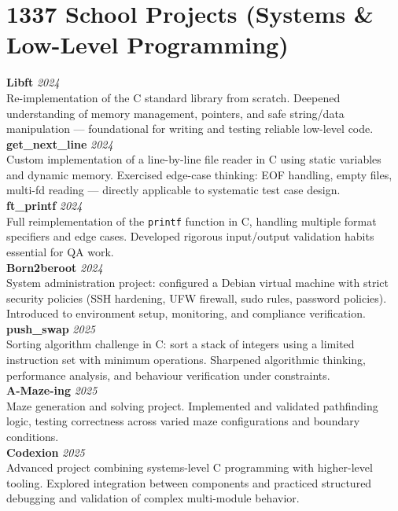 \documentclass[10pt, a4paper]{article}
\newcommand{\project}[3]{%
  \textbf{\color{black}#1} \hfill \textit{\small\color{medgray}#2}\\
  {\small\color{darkgray}#3}\\
}
\begin{document}
\section{1337 School Projects (Systems \& Low-Level Programming)}

\project{Libft}{2024}%
  {Re-implementation of the C standard library from scratch. Deepened understanding of memory management, pointers, and safe string/data manipulation — foundational for writing and testing reliable low-level code.}

\vspace{4pt}
\project{get\_next\_line}{2024}%
  {Custom implementation of a line-by-line file reader in C using static variables and dynamic memory. Exercised edge-case thinking: EOF handling, empty files, multi-fd reading — directly applicable to systematic test case design.}

\vspace{4pt}
\project{ft\_printf}{2024}%
  {Full reimplementation of the \texttt{printf} function in C, handling multiple format specifiers and edge cases. Developed rigorous input/output validation habits essential for QA work.}

\vspace{4pt}
\project{Born2beroot}{2024}%
  {System administration project: configured a Debian virtual machine with strict security policies (SSH hardening, UFW firewall, sudo rules, password policies). Introduced to environment setup, monitoring, and compliance verification.}

\vspace{4pt}
\project{push\_swap}{2025}%
  {Sorting algorithm challenge in C: sort a stack of integers using a limited instruction set with minimum operations. Sharpened algorithmic thinking, performance analysis, and behaviour verification under constraints.}

\vspace{4pt}
\project{A-Maze-ing}{2025}%
  {Maze generation and solving project. Implemented and validated pathfinding logic, testing correctness across varied maze configurations and boundary conditions.}

\vspace{4pt}
\project{Codexion}{2025}%
  {Advanced project combining systems-level C programming with higher-level tooling. Explored integration between components and practiced structured debugging and validation of complex multi-module behavior.}
\end{document}
